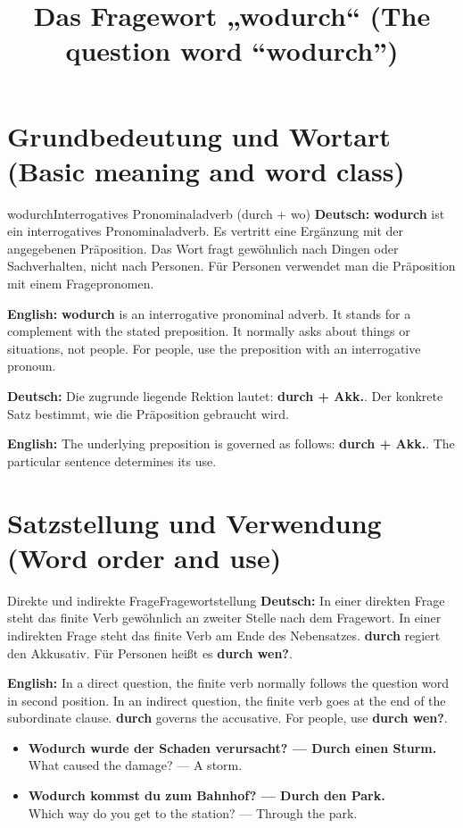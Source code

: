 \documentclass[a4paper,11pt]{article}
\title{Das Fragewort „wodurch“ (The question word “wodurch”)}
\date{}
\newcommand{\GermanText}[1]{\textbf{Deutsch: }#1\par}
\newcommand{\EnglishText}[1]{{\small\color{SoftGray}\textbf{English: }#1\par}}
\newcommand{\ExampleItem}[2]{\item \textbf{#1}\\{\small\color{SoftGray}#2}}
\begin{document}
\maketitle
\tableofcontents
\newpage
\section{Grundbedeutung und Wortart (Basic meaning and word class)}
\begin{grammarentry}{wodurch}{Interrogatives Pronominaladverb (durch + wo)}
\GermanText{\textbf{wodurch} ist ein interrogatives Pronominaladverb. Es vertritt eine Ergänzung mit der angegebenen Präposition. Das Wort fragt gewöhnlich nach Dingen oder Sachverhalten, nicht nach Personen. Für Personen verwendet man die Präposition mit einem Fragepronomen.}
\EnglishText{\textbf{wodurch} is an interrogative pronominal adverb. It stands for a complement with the stated preposition. It normally asks about things or situations, not people. For people, use the preposition with an interrogative pronoun.}
\GermanText{Die zugrunde liegende Rektion lautet: \textbf{durch + Akk.}. Der konkrete Satz bestimmt, wie die Präposition gebraucht wird.}
\EnglishText{The underlying preposition is governed as follows: \textbf{durch + Akk.}. The particular sentence determines its use.}
\end{grammarentry}
\section{Satzstellung und Verwendung (Word order and use)}
\begin{grammarentry}{Direkte und indirekte Frage}{Fragewortstellung}
\GermanText{In einer direkten Frage steht das finite Verb gewöhnlich an zweiter Stelle nach dem Fragewort. In einer indirekten Frage steht das finite Verb am Ende des Nebensatzes. \textbf{durch} regiert den Akkusativ. Für Personen heißt es \textbf{durch wen?}.}
\EnglishText{In a direct question, the finite verb normally follows the question word in second position. In an indirect question, the finite verb goes at the end of the subordinate clause. \textbf{durch} governs the accusative. For people, use \textbf{durch wen?}.}
\end{grammarentry}
\begin{exbox}\begin{itemize}
\ExampleItem{Wodurch wurde der Schaden verursacht? — Durch einen Sturm.}{What caused the damage? — A storm.}
\ExampleItem{Wodurch kommst du zum Bahnhof? — Durch den Park.}{Which way do you get to the station? — Through the park.}
\end{itemize}\end{exbox}
\end{document}
